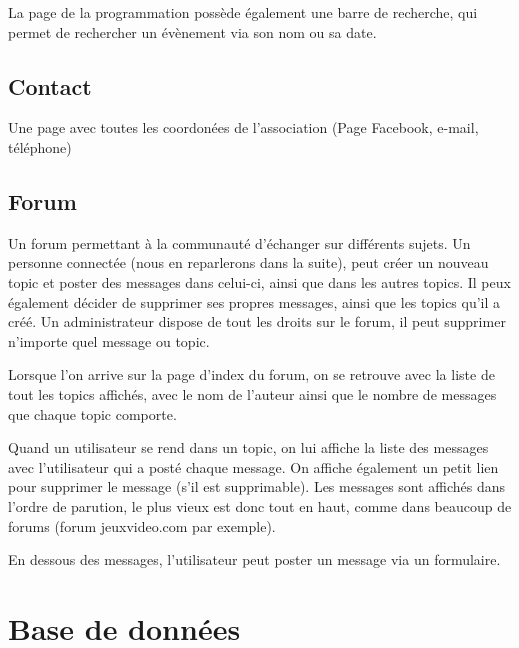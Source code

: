 \documentclass[a4paper, 12pt]{article}
\begin{document}
La page de la programmation possède également une barre de recherche, qui permet de rechercher un évènement via son nom ou sa date.

\subsection{Contact}
Une page avec toutes les coordonées de l'association (Page Facebook, e-mail, téléphone)

\subsection{Forum}
Un forum permettant à la communauté d'échanger sur différents sujets. Un personne connectée (nous en reparlerons dans la suite), peut créer un nouveau topic et poster des messages dans celui-ci, ainsi que dans les autres topics. Il peux également décider de supprimer ses propres messages, ainsi que les topics qu'il a créé.
Un administrateur dispose de tout les droits sur le forum, il peut supprimer n'importe quel message ou topic.

Lorsque l'on arrive sur la page d'index du forum, on se retrouve avec la liste de tout les topics affichés, avec le nom de l'auteur ainsi que le nombre de messages que chaque topic comporte.

Quand un utilisateur se rend dans un topic, on lui affiche la liste des messages avec l'utilisateur qui a posté chaque message. On affiche également un petit lien pour supprimer le message (s'il est supprimable). Les messages sont affichés dans l'ordre de parution, le plus vieux est donc tout en haut, comme dans beaucoup de forums (forum jeuxvideo.com par exemple).

En dessous des messages, l'utilisateur peut poster un message via un formulaire.

\section{Base de données}
\end{document}
